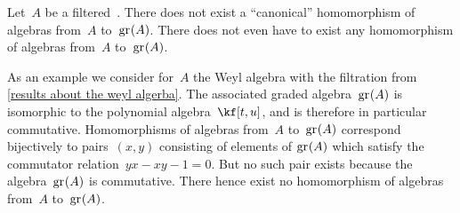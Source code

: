 \begin{warning}
	Let~$A$ be a filtered~\algebra{$\kf$}.
	There does not exist a \enquote{canonical} homomorphism of algebras from~$A$ to~$\gr(A)$.
	There does not even have to exist any homomorphism of algebras from~$A$ to~$\gr(A)$.

	As an example we consider for~$A$ the Weyl algebra with the filtration from \cref{results about the weyl algerba}.
	The associated graded algebra~$\gr(A)$ is isomorphic to the polynomial algebra~$\kf[t,u]$, and is therefore in particular commutative.
	Homomorphisms of algebras from~$A$ to~$\gr(A)$ correspond bijectively to pairs~$(x, y)$ consisting of elements of $\gr(A)$ which satisfy the commutator relation~$yx - xy - 1 = 0$.
	But no such pair exists because the algebra~$\gr(A)$ is commutative.
	There hence exist no homomorphism of algebras from~$A$ to~$\gr(A)$.
\end{warning}






